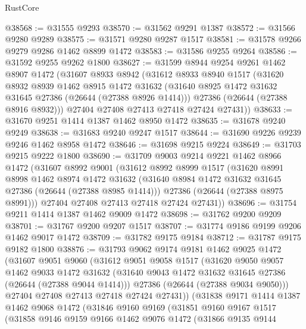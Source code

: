 \begin{lexlean}{RustCore}
\begin{coremodule}
@38568 := @31555 @9293
@38570 := @31562 @9291 @1387
@38572 := @31566 @9280 @9289
@38575 := @31571 @9280 @9287 @1517
@38581 := @31578 @9266 @9279 @9286 @1462 @8899 @1472
@38583 := @31586 @9255 @9264
@38586 := @31592 @9255 @9262 @1800
@38627 := @31599
    @8944
    @9254
    @9261
    @1462
    @8907
    @1472
    (@31607
      @8933
      @8942
      (@31612
        @8933
        @8940
        @1517
        (@31620
          @8932
          @8939
          @1462
          @8915
          @1472
          @31632
          (@31640 @8925 @1472 @31632 @31645 @27386 (@26644 (@27388 @8926 @1414)))
          @27386
          (@26644 (@27388 @8916 @8932)))
        @27404
        @27408
        @27413
        @27418
        @27424
        @27431))
@38633 := @31670 @9251 @1414 @1387 @1462 @8950 @1472
@38635 := @31678 @9240 @9249
@38638 := @31683 @9240 @9247 @1517
@38644 := @31690 @9226 @9239 @9246 @1462 @8958 @1472
@38646 := @31698 @9215 @9224
@38649 := @31703 @9215 @9222 @1800
@38690 := @31709
    @9003
    @9214
    @9221
    @1462
    @8966
    @1472
    (@31607
      @8992
      @9001
      (@31612
        @8992
        @8999
        @1517
        (@31620
          @8991
          @8998
          @1462
          @8974
          @1472
          @31632
          (@31640 @8984 @1472 @31632 @31645 @27386 (@26644 (@27388 @8985 @1414)))
          @27386
          (@26644 (@27388 @8975 @8991)))
        @27404
        @27408
        @27413
        @27418
        @27424
        @27431))
@38696 := @31754 @9211 @1414 @1387 @1462 @9009 @1472
@38698 := @31762 @9200 @9209
@38701 := @31767 @9200 @9207 @1517
@38707 := @31774 @9186 @9199 @9206 @1462 @9017 @1472
@38709 := @31782 @9175 @9184
@38712 := @31787 @9175 @9182 @1800
@38876 := @31793
    @9062
    @9174
    @9181
    @1462
    @9025
    @1472
    (@31607
      @9051
      @9060
      (@31612
        @9051
        @9058
        @1517
        (@31620
          @9050
          @9057
          @1462
          @9033
          @1472
          @31632
          (@31640 @9043 @1472 @31632 @31645 @27386 (@26644 (@27388 @9044 @1414)))
          @27386
          (@26644 (@27388 @9034 @9050)))
        @27404
        @27408
        @27413
        @27418
        @27424
        @27431))
    (@31838
      @9171
      @1414
      @1387
      @1462
      @9068
      @1472
      (@31846
        @9160
        @9169
        (@31851
          @9160
          @9167
          @1517
          (@31858
            @9146
            @9159
            @9166
            @1462
            @9076
            @1472
            (@31866
              @9135
              @9144

\end{coremodule}
\end{lexlean}
